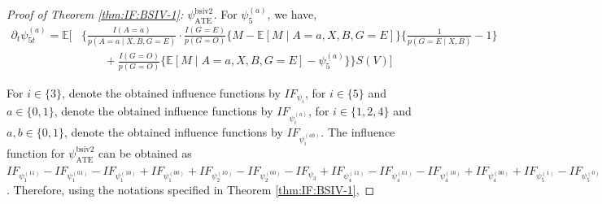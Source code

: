 \documentclass[10pt]{article}
\begin{document}
\begin{proof}[Proof of Theorem \ref{thm:IF:BSIV-1}: $\psi_{\text{ATE}}^{\text{bsiv2}}$]
For $\psi_5^{(a)}$, we have,
{\footnotesize \begin{align*}
    \partial_{t}\psi_{5t}^{(a)}=\mathbb{E}\Bigg[&\Bigg\{\frac{I(A=a)}{p(A=a\mid X,B, G=E)}\cdot\frac{I(G=E)}{p(G=O)}\{M-\mathbb{E}[M\mid A=a,X,B,G=E]\}\{\frac{1}{p(G=E\mid X,B)}-1\}\\
    &\ \ \ \ \ \ \ \ \ +\frac{I(G=O)}{p(G=O)}\{\mathbb{E}[M\mid A=a,X,B,G=E]-\psi_5^{(a)}\}\Bigg\}S(V)\Bigg]
\end{align*}}

For $i\in\{3\}$, denote the obtained influence functions by $IF_{\psi_i}$, for $i\in\{5\}$ and $a\in\{0,1\}$, denote the obtained influence functions by $IF_{\psi_i^{(a)}}$, for $i\in\{1,2,4\}$ and $a,b\in\{0,1\}$, denote the obtained influence functions by $IF_{\psi_i^{(ab)}}$. The influence function for $\psi_{\text{ATE}}^{\text{bsiv2}}$ can be obtained as $IF_{\psi_1^{(11)}}-IF_{\psi_1^{(01)}}-IF_{\psi_1^{(10)}}+IF_{\psi_1^{(00)}}+IF_{\psi_2^{(10)}}-IF_{\psi_2^{(00)}}-IF_{\psi_3}+IF_{\psi_4^{(11)}}-IF_{\psi_4^{(01)}}-IF_{\psi_4^{(10)}}+IF_{\psi_4^{(00)}}+IF_{\psi_5^{(1)}}-IF_{\psi_5^{(0)}}$. Therefore, using the notations specified in Theorem \ref{thm:IF:BSIV-1},


\end{proof}
\end{document}
